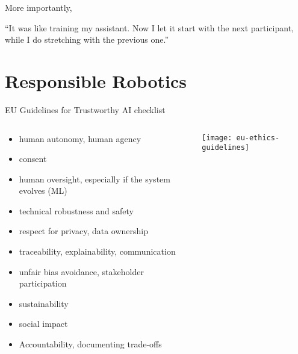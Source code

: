\documentclass[xcolor=table,aspectratio=169]{beamer}
\begin{document}
\begin{frame}{}

    More importantly,


    \begin{center}

    \large{``It was like training my assistant. Now I let it start with the
    next participant, while I do stretching with the previous one.''}

    \end{center}

\end{frame}

\section{Responsible Robotics}

\begin{frame}{EU Guidelines for Trustworthy AI checklist}
    \begin{columns}
        \begin{column}{0.6\linewidth}

    \begin{itemize}
        \item human autonomy, human agency
        \item consent
        \item human oversight, especially if the system evolves (ML)
        \item technical robustness and safety
        \item respect for privacy, data ownership
        \item traceability, explainability, communication
        \item unfair bias avoidance, stakeholder participation
        \item sustainability
        \item social impact
        \item Accountability, documenting trade-offs

    \end{itemize}
        \end{column}
        \begin{column}{0.4\linewidth}
            \begin{center}
                \texttt{[image: eu-ethics-guidelines]}
            \end{center}
        \end{column}
    \end{columns}
\end{frame}
\end{document}
